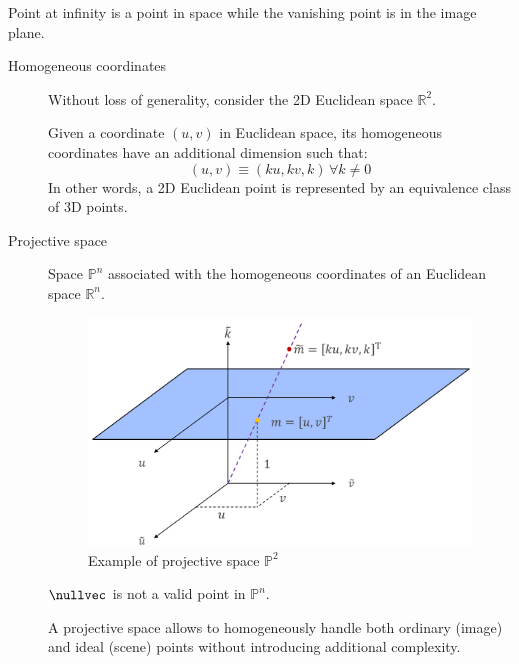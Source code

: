 \begin{remark}
    Point at infinity is a point in space while the vanishing point is in the image plane.
\end{remark}

\begin{description}
    \item[Homogeneous coordinates] 
        Without loss of generality, consider the 2D Euclidean space $\mathbb{R}^2$.

        Given a coordinate $(u, v)$ in Euclidean space, its homogeneous coordinates have an additional dimension
        such that:
        \[ (u, v) \equiv (ku, kv, k) \,\forall k \neq 0 \]
        In other words, a 2D Euclidean point is represented by an equivalence class of 3D points.

    \item[Projective space] 
        Space $\mathbb{P}^n$ associated with the homogeneous coordinates of an Euclidean space $\mathbb{R}^n$.

        \begin{figure}[H]
            \centering
            \includegraphics[width=0.6\linewidth]{./img/_projective_space.pdf}
            \caption{Example of projective space $\mathbb{P}^2$}
        \end{figure}

        \begin{remark}
            $\nullvec$ is not a valid point in $\mathbb{P}^n$.
        \end{remark}

        \begin{remark}
            A projective space allows to homogeneously handle both ordinary (image) and ideal (scene) points without introducing additional complexity.
        \end{remark}


\end{description}

